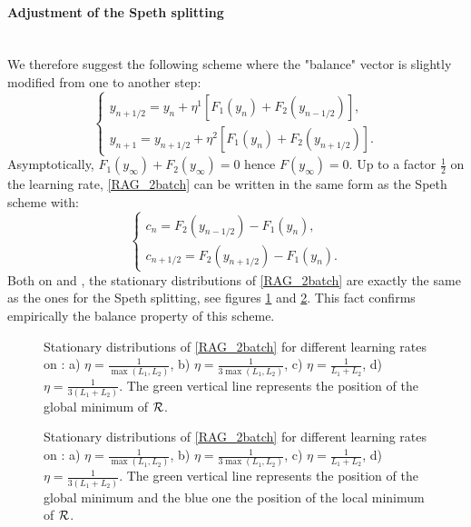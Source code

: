 \paragraph{Adjustment of the Speth splitting}
~~\\
We therefore suggest the following scheme where the "balance" vector is slightly modified from one to another step:
\begin{equation}
	\left\{
	\begin{array}{ll}
		y_{n+1/2} = y_n + \eta^1 \left[F_1(y_n)+F_2(y_{n-1/2})\right],\\
		y_{n+1} = y_{n+1/2} + \eta^2 \left[F_1(y_n)+F_2(y_{n+1/2})\right].
	\end{array}
	\right.
	\label{RAG_2batch}
\end{equation}
Asymptotically, $F_1(y_{\infty})+F_2(y_{\infty})=0$ hence $F(y_{\infty})=0$.
Up to a factor $\frac{1}{2}$ on the learning rate, 
\eqref{RAG_2batch} can be written in the same form as the Speth scheme with:
\begin{equation*}
	\left\{
	\begin{array}{ll}
		c_n = F_2(y_{n-1/2})-F_1(y_n),\\
		c_{n+1/2} = F_2(y_{n+1/2})-F_1(y_n).
	\end{array}
	\right.
\end{equation*}
Both on \exOne and \exTwo, the stationary distributions of \eqref{RAG_2batch} are exactly the same as the ones for the Speth splitting, see figures \ref{IAG_ex1} and \ref{IAG_ex2}. This fact confirms empirically the balance property of this scheme.

\begin{figure}[h!]
	\centering
	\scalebox{0.45}{}
	\caption{Stationary distributions of \eqref{RAG_2batch} for different learning rates on \exOne: a) $\eta=\frac{1}{\max(L_1,L_2)}$, b) $\eta=\frac{1}{3\max(L_1,L_2)}$, c) $\eta=\frac{1}{L_1+L_2}$, d) $\eta=\frac{1}{3(L_1+L_2)}$. The green vertical line represents the position of the global minimum of $\mathcal{R}$.}
	\label{IAG_ex1}
\end{figure}

\begin{figure}[h!]
	\centering
	\scalebox{0.45}{}
	\caption{Stationary distributions of \eqref{RAG_2batch} for different learning rates on \exTwo: a) $\eta=\frac{1}{\max(L_1,L_2)}$, b) $\eta=\frac{1}{3\max(L_1,L_2)}$, c) $\eta=\frac{1}{L_1+L_2}$, d) $\eta=\frac{1}{3(L_1+L_2)}$. The green vertical line represents the position of the global minimum and the blue one the position of the local minimum of $\mathcal{R}$.}
	\label{IAG_ex2}
\end{figure}

